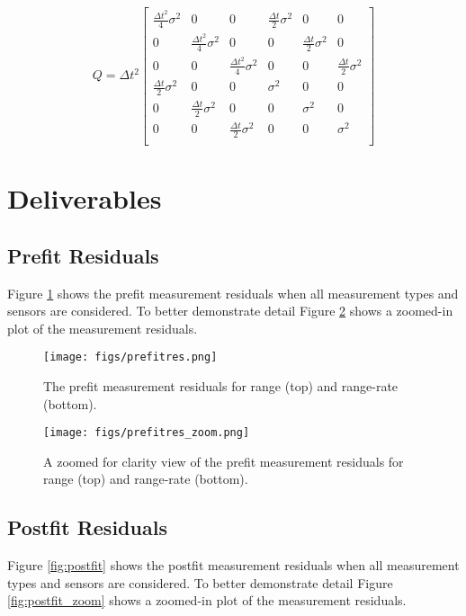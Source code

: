 \documentclass[11pt]{article}
\begin{document}
\begin{equation}
\label{eq:Q}
Q = \Delta t^2 \begin{bmatrix}
\frac{\Delta t^2}{4} \sigma^2 & 0 & 0 & \frac{\Delta t}{2} \sigma^2 & 0 & 0 \\
0 & \frac{\Delta t^2}{4} \sigma^2 & 0 & 0 & \frac{\Delta t}{2} \sigma^2 & 0 \\
0 & 0 & \frac{\Delta t^2}{4} \sigma^2 & 0 & 0 & \frac{\Delta t}{2} \sigma^2 \\
\frac{\Delta t}{2} \sigma^2 & 0 & 0 & \sigma^2 & 0 & 0 \\
0 & \frac{\Delta t}{2} \sigma^2 & 0 & 0 & \sigma^2 & 0 \\
0 & 0 & \frac{\Delta t}{2} \sigma^2 & 0 & 0 & \sigma^2 \\	
\end{bmatrix}
\end{equation}

\section{Deliverables}

\subsection{Prefit Residuals}

Figure \ref{fig:prefit} shows the prefit measurement residuals when all measurement types and sensors are considered. To better demonstrate detail Figure \ref{fig:prefit_zoom} shows a zoomed-in plot of the measurement residuals.

\begin{figure}[!htb]
	\centering
	\texttt{[image: figs/prefitres.png]}
	\caption{The prefit measurement residuals for range (top) and range-rate (bottom).}
	\label{fig:prefit}
\end{figure}

\begin{figure}[!htb]
	\centering
	\texttt{[image: figs/prefitres\_zoom.png]}
	\caption{A zoomed for clarity view of the prefit measurement residuals for range (top) and range-rate (bottom).}
	\label{fig:prefit_zoom}
\end{figure}

\subsection{Postfit Residuals}

Figure \ref{fig:postfit} shows the postfit measurement residuals when all measurement types and sensors are considered. To better demonstrate detail Figure \ref{fig:postfit_zoom} shows a zoomed-in plot of the measurement residuals.
\end{document}
